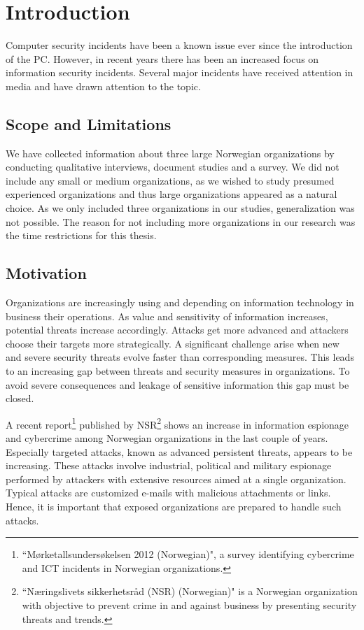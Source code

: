 \chapter{Introduction}
Computer security incidents have been a known issue ever since the introduction of the PC. However, in recent years there has been an increased focus on information security incidents. Several major incidents have received attention in media and have drawn attention to the topic. %

\section{Scope and Limitations}
We have collected information about three large Norwegian organizations by conducting qualitative interviews, document studies and a survey. We did not include any small or medium organizations, as we wished to study presumed experienced organizations and thus large organizations appeared as a natural choice. As we only included three organizations in our studies, generalization was not possible. The reason for not including more organizations in our research was the time restrictions for this thesis.

\section{Motivation}
Organizations are increasingly using and depending on information technology in business their operations. As value and sensitivity of information increases, potential threats increase accordingly. Attacks get more advanced and attackers choose their targets more strategically. A significant challenge arise when new and severe security threats evolve faster than corresponding measures. This leads to an increasing gap between threats and security measures in organizations. To avoid severe consequences and leakage of sensitive information this gap must be closed.

A recent report\footnote{``Mørketallsundersøkelsen 2012 (Norwegian)", a survey identifying cybercrime and \ac{ICT} incidents in Norwegian organizations.} published by NSR\footnote{``Næringslivets sikkerhetsråd (NSR) (Norwegian)" is a Norwegian organization with objective to prevent crime in and against business by presenting security threats and trends.} shows an increase in information espionage and cybercrime among Norwegian organizations in the last couple of years\cite{Morketall2012}. Especially targeted attacks, known as advanced persistent threats, appears to be increasing. These attacks involve industrial, political and military espionage performed by attackers with extensive resources aimed at a single organization. Typical attacks are customized e-mails with malicious attachments or links. Hence, it is important that exposed organizations are prepared to handle such attacks. 

